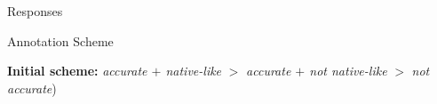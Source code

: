 \documentclass[final,14pt,t]{beamer}
\begin{document}
\begin{frame}{}
\begin{columns}[t]
\begin{column}{.33\linewidth}
\begin{minipage}[t][\textheight]{\linewidth}
\begin{block}{Responses}
\begin{center}
\begin{minipage}{.85\textwidth}
\end{minipage}
\end{center}
\vspace{-.5em}
\end{block} 



\begin{block}{Annotation Scheme}
\begin{center}
\begin{minipage}{.85\textwidth}

\textbf{Initial scheme:} \textit{accurate $+$ native-like} $>$ \textit{accurate $+$ not native-like} $>$ \textit{not accurate})


\end{minipage}
\end{center}
\end{block}
\end{minipage}
\end{column}
\end{columns}
\end{frame}
\end{document}
